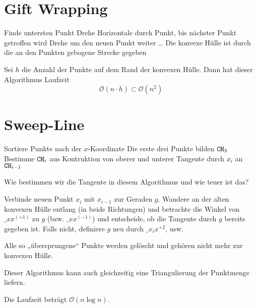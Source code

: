 \documentclass{mycourse}
\renewcommand{\O}{\mathcal{O}}
\begin{document}
\section{Gift Wrapping}

\begin{alg}
	\begin{algorithmic}
		\State Finde untersten Punkt
		\State Drehe Horizontale durch Punkt, bis nächster Punkt getroffen wird
		\State Drehe um den neuen Punkt weiter
		\State \dots
		\State Die konvexe Hülle ist durch die an den Punkten gebogene Strecke gegeben
	\end{algorithmic}
	Sei $h$ die Anzahl der Punkte auf dem Rand der konvexen Hülle.
	Dann hat dieser Algorithmus Laufzeit
	\[
		\O(n\cdot h) \subset \O(n^2)
	\]
\end{alg}

\section{Sweep-Line}

\begin{alg}
	\begin{algorithmic}
		\State Sortiere Punkte nach der $x$-Koordinate
		\State Die erste drei Punkte bilden $\texttt{CH}_3$
		\For{$i=4,\dotsc,n$}
			\State Bestimme $\texttt{CH}_i$ aus Kontruktion von oberer und unterer Tangente durch $x_i$ an $\texttt{CH}_{i-1}$
		\EndFor
	\end{algorithmic}
\end{alg}

Wie bestimmen wir die Tangente in diesem Algorithmus und wie teuer ist das?

Verbinde neuen Punkt $x_i$ mit $x_{i-1}$ zur Geraden $g$.
Wandere an der alten konvexen Hülle entlang (in beide Richtungen) und betrachte die Winkel von $\_{xx^{(+1)}}$ zu $g$ (bzw. $\_{xx^{(-1)}}$) und entscheide, ob die Tangente durch $g$ bereits gegeben ist.
Falls nicht, definiere $g$ neu durch $\_{x_ix^{+2}}$, usw.

Alle so „übersprungene“ Punkte werden gelöscht und gehören nicht mehr zur konvexen Hülle.


\begin{note}
	Dieser Algorithmus kann auch gleichzeitig eine Triangulierung der Punktmenge liefern.
\end{note}

Die Laufzeit beträgt $\O(n\log n)$.
\end{document}
